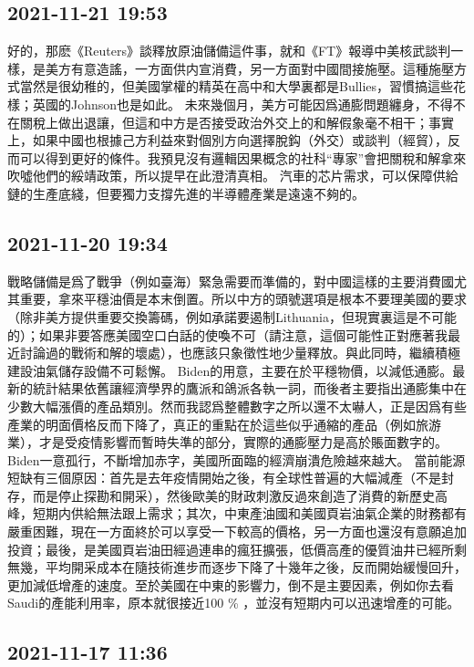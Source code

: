 \documentclass[twocolumn]{ctexart}
\begin{document}
\subsection*{2021-11-21 19:53}

好的，那麽《Reuters》談釋放原油儲備這件事，就和《FT》報導中美核武談判一樣，是美方有意造謠，一方面供内宣消費，另一方面對中國間接施壓。這種施壓方式當然是很幼稚的，但美國掌權的精英在高中和大學裏都是Bullies，習慣搞這些花樣；英國的Johnson也是如此。
未來幾個月，美方可能因爲通膨問題纏身，不得不在關稅上做出退讓，但這和中方是否接受政治外交上的和解假象毫不相干；事實上，如果中國也根據己方利益來對個別方向選擇脫鈎（外交）或談判（經貿），反而可以得到更好的條件。我預見沒有邏輯因果概念的社科“專家”會把關稅和解拿來吹噓他們的綏靖政策，所以提早在此澄清真相。
汽車的芯片需求，可以保障供給鏈的生產底綫，但要獨力支撐先進的半導體產業是遠遠不夠的。
\subsection*{2021-11-20 19:34}

戰略儲備是爲了戰爭（例如臺海）緊急需要而準備的，對中國這樣的主要消費國尤其重要，拿來平穩油價是本末倒置。所以中方的頭號選項是根本不要理美國的要求（除非美方提供重要交換籌碼，例如承諾要遏制Lithuania，但現實裏這是不可能的）；如果非要答應美國空口白話的使喚不可（請注意，這個可能性正對應著我最近討論過的戰術和解的壞處），也應該只象徵性地少量釋放。與此同時，繼續積極建設油氣儲存設備不可鬆懈。
Biden的用意，主要在於平穩物價，以減低通膨。最新的統計結果依舊讓經濟學界的鷹派和鴿派各執一詞，而後者主要指出通膨集中在少數大幅漲價的產品類別。然而我認爲整體數字之所以還不太嚇人，正是因爲有些產業的明面價格反而下降了，真正的重點在於這些似乎通縮的產品（例如旅游業），才是受疫情影響而暫時失準的部分，實際的通膨壓力是高於賬面數字的。Biden一意孤行，不斷增加赤字，美國所面臨的經濟崩潰危險越來越大。
當前能源短缺有三個原因：首先是去年疫情開始之後，有全球性普遍的大幅減產（不是封存，而是停止探勘和開采），然後歐美的財政刺激反過來創造了消費的新歷史高峰，短期内供給無法跟上需求；其次，中東產油國和美國頁岩油氣企業的財務都有嚴重困難，現在一方面終於可以享受一下較高的價格，另一方面也還沒有意願追加投資；最後，是美國頁岩油田經過連串的瘋狂擴張，低價高產的優質油井已經所剩無幾，平均開采成本在隨技術進步而逐步下降了十幾年之後，反而開始緩慢回升，更加減低增產的速度。至於美國在中東的影響力，倒不是主要因素，例如你去看Saudi的產能利用率，原本就很接近100 \% ，並沒有短期内可以迅速增產的可能。
\subsection*{2021-11-17 11:36}
\end{document}
